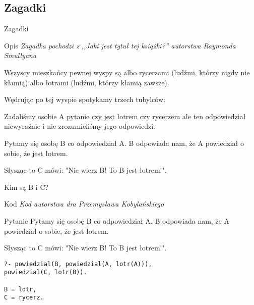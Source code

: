 \documentclass[blue]{beamer}
\newcommand{\tytul}[1]{\begin{frame}\begin{center}\begin{Huge}#1\end{Huge}\end{center}\end{frame}}
\begin{document}
\subsection{Zagadki}
\tytul{Zagadki}
\begin{frame}{Opis}
\textit{Zagadka pochodzi z ,,Jaki jest tytuł tej książki?'' autorstwa Raymonda Smullyana}

Wszyscy mieszkańcy pewnej wyspy są albo rycerzami (ludźmi, którzy nigdy nie kłamią) albo łotrami (ludźmi, którzy kłamią zawsze).

Wędrując po tej wyspie spotykamy trzech tubylców:

Zadaliśmy osobie A pytanie czy jest łotrem czy rycerzem ale ten odpowiedział niewyraźnie i nie zrozumieliśmy jego odpowiedzi.

Pytamy się osobę B co odpowiedział A. B odpowiada nam, że A powiedział o sobie, że jest łotrem.

Słysząc to C mówi: "Nie wierz B! To B jest łotrem!".

Kim są B i C?
\end{frame}
\begin{frame}{Kod}
\textit{Kod autorstwa dra Przemysława Kobylańskiego}

\end{frame}
\begin{frame}[fragile]{Pytanie}
Pytamy się osobę B co odpowiedział A. B odpowiada nam, że A powiedział o sobie, że jest łotrem.

Słysząc to C mówi: "Nie wierz B! To B jest łotrem!".
\begin{lstlisting}
?- powiedzial(B, powiedzial(A, lotr(A))),
powiedzial(C, lotr(B)).

B = lotr,
C = rycerz.
\end{lstlisting}
\end{frame}
\end{document}
